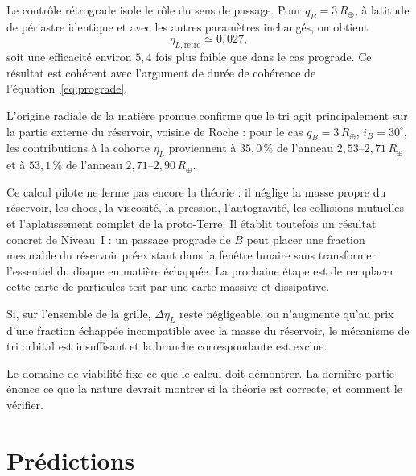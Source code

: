 \documentclass[11pt,a4paper,openany]{report}
\newcommand{\Rt}{R_{\oplus}}
\begin{document}
Le contrôle rétrograde isole le rôle du sens de passage. Pour $q_B=3\,\Rt$, à latitude de
périastre identique et avec les autres paramètres inchangés, on obtient
\begin{equation}
\eta_{L,\mathrm{retro}}\simeq0{,}027,
\label{eq:retro-pilote}
\end{equation}
soit une efficacité environ $5{,}4$ fois plus faible que dans le cas prograde. Ce résultat est cohérent
avec l'argument de durée de cohérence de l'équation~\eqref{eq:prograde}.

L'origine radiale de la matière promue confirme que le tri agit principalement sur la partie externe
du réservoir, voisine de Roche : pour le cas $q_B=3\,\Rt$, $i_B=30^\circ$, les contributions à la
cohorte $\eta_L$ proviennent à $35{,}0\,\%$ de l'anneau $2{,}53$--$2{,}71\,\Rt$ et à
$53{,}1\,\%$ de l'anneau $2{,}71$--$2{,}90\,\Rt$.

\begin{controle}
Ce calcul pilote ne ferme pas encore la théorie : il néglige la masse propre du réservoir, les chocs,
la viscosité, la pression, l'autogravité, les collisions mutuelles et l'aplatissement complet de la
proto-Terre. Il établit toutefois un résultat concret de Niveau~I : un passage prograde de $B$ peut
placer une fraction mesurable du réservoir préexistant dans la fenêtre lunaire sans transformer
l'essentiel du disque en matière échappée. La prochaine étape est de remplacer cette carte de
particules test par une carte massive et dissipative.
\end{controle}

\begin{falsif}
Si, sur l'ensemble de la grille, $\Delta\eta_L$ reste négligeable, ou n'augmente qu'au prix d'une
fraction échappée incompatible avec la masse du réservoir, le mécanisme de tri orbital est
insuffisant et la branche correspondante est exclue.
\end{falsif}

\begin{rappel}
Le domaine de viabilité fixe ce que le calcul doit démontrer. La dernière partie énonce ce que la
nature devrait montrer si la théorie est correcte, et comment le vérifier.
\end{rappel}

\part{Prédictions}
\label{part:predictions}
\end{document}

